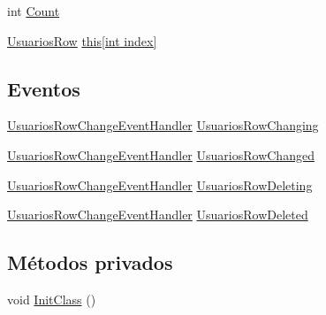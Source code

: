 \begin{DoxyCompactItemize}
\item 
int \hyperlink{class_proyecto___integrador__3_1_1ds_usuarios_1_1_usuarios_data_table_add36016d5b2cfdde84930b0621a946e1}{Count}
\item 
\hyperlink{class_proyecto___integrador__3_1_1ds_usuarios_1_1_usuarios_row}{Usuarios\-Row} \hyperlink{class_proyecto___integrador__3_1_1ds_usuarios_1_1_usuarios_data_table_a15cc02fb6a8d5b49b6c6b1eaeaf4524e}{this\mbox{[}int index\mbox{]}}
\end{DoxyCompactItemize}
\subsection*{Eventos}
\begin{DoxyCompactItemize}
\item 
\hyperlink{class_proyecto___integrador__3_1_1ds_usuarios_a571e2cc717092f4996c9c805a464415b}{Usuarios\-Row\-Change\-Event\-Handler} \hyperlink{class_proyecto___integrador__3_1_1ds_usuarios_1_1_usuarios_data_table_ad0fa4543fc49714f894e2d254149a10a}{Usuarios\-Row\-Changing}
\item 
\hyperlink{class_proyecto___integrador__3_1_1ds_usuarios_a571e2cc717092f4996c9c805a464415b}{Usuarios\-Row\-Change\-Event\-Handler} \hyperlink{class_proyecto___integrador__3_1_1ds_usuarios_1_1_usuarios_data_table_aa8b094b9cf5719c95f250eab04e924b6}{Usuarios\-Row\-Changed}
\item 
\hyperlink{class_proyecto___integrador__3_1_1ds_usuarios_a571e2cc717092f4996c9c805a464415b}{Usuarios\-Row\-Change\-Event\-Handler} \hyperlink{class_proyecto___integrador__3_1_1ds_usuarios_1_1_usuarios_data_table_ac2f7f55347d3da57ae9769a7358f2ac6}{Usuarios\-Row\-Deleting}
\item 
\hyperlink{class_proyecto___integrador__3_1_1ds_usuarios_a571e2cc717092f4996c9c805a464415b}{Usuarios\-Row\-Change\-Event\-Handler} \hyperlink{class_proyecto___integrador__3_1_1ds_usuarios_1_1_usuarios_data_table_a7f14b5c1917873a25cdaefc417fee6bc}{Usuarios\-Row\-Deleted}
\end{DoxyCompactItemize}
\subsection*{Métodos privados}
\begin{DoxyCompactItemize}
\item 
void \hyperlink{class_proyecto___integrador__3_1_1ds_usuarios_1_1_usuarios_data_table_a42bdd8edf5d2daabd75e72fba1bf156f}{Init\-Class} ()
\end{DoxyCompactItemize}
